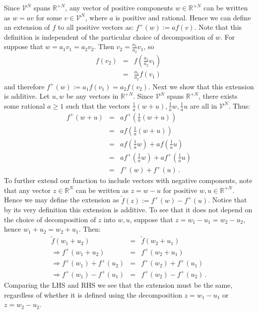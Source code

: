 \documentclass[%
 reprint,superscriptaddress,
 amsmath,amssymb,
 aps,twocolumn,pra
]{revtex4-1}
\newcommand{\eqn}[1]{\begin{eqnarray} #1 \end{eqnarray}}
\begin{document}
\begin{appendix}
Since $\mathcal{V}^N$ spans $\mathbb{R}^{+ N}$, any vector of positive components $w \in \mathbb{R}^{+ N}$ can be written as $w = a v$ for some $v \in \mathcal{V}^N$, where $a$ is positive and rational. Hence we can define an extension of $f$ to all positive vectors as: $f^+(w) := a f(v)$. Note that this definition is independent of the particular choice of  decomposition of $w$. For suppose that $w = a_1 v_1 = a_2 v_2$. Then $v_2 = \frac{a_1}{a_2} v_1$, so
\eqn{
f(v_2) &=& f\left( \frac{a_1}{a_2} v_1 \right) \nonumber \\
&=& \frac{a_1}{a_2} f\left( v_1 \right) \,
}
and therefore $f^{+}(w) := a_1 f(v_1) = a_2 f(v_2)$. Next we show that this extension is additive. Let $u,w$ be any vectors in $\mathbb{R}^{+ N}$. Since $\mathcal{V}^N$ spans $\mathbb{R}^{+ N}$, there exists some rational $a \geq 1$ such that the vectors $\frac{1}{a}(w+u),\frac{1}{a}w, \frac{1}{a}u$ are all in $\mathcal{V}^N$. Thus:
\eqn{
f^{+}(w+u) &=& a f^{+}\left( \frac{1}{a}(w+u) \right) \nonumber \\
&=& a f\left( \frac{1}{a}(w+u) \right) \nonumber \\
&=& a f\left( \frac{1}{a}w \right) + a f\left( \frac{1}{a}u \right) \nonumber \\
&=& a f^{+}\left( \frac{1}{a}w \right) + a f^{+}\left( \frac{1}{a}u \right) \nonumber \\
&=& f^{+}\left( w \right) +  f^{+}\left( u \right) \, .
}
To further extend our function to include vectors with negative components, note that any vector $z \in \mathbb{R}^{N}$ can be written as $z = w-u$ for positive $w,u \in \mathbb{R}^{+ N}$. Hence we may define the extension as $ \tilde{f}(z) := f^{+}(w)-f^{+}(u)$. Notice that by its very definition this extension is additive. To see that it does not depend on the choice of decomposition of $z$ into $w,u$, suppose that $z = w_1 - u_1 = w_2 - u_2$, hence $w_1+u_2 = w_2+u_1$. Then:
\eqn{
\tilde{f}(w_1+u_2) &=& \tilde{f}(w_2+u_1) \nonumber \\
\Rightarrow f^{+}(w_1+u_2) &=& f^{+}(w_2+u_1) \nonumber \\
\Rightarrow f^{+}(w_1)+f^{+}(u_2) &=& f^{+}(w_2)+f^{+}(u_1) \nonumber \\
\Rightarrow f^{+}(w_1)-f^{+}(u_1) &=& f^{+}(w_2)-f^{+}(u_2) \, .
}
Comparing the LHS and RHS we see that the extension must be the same, regardless of whether it is defined using the decomposition $z = w_1 - u_1$ or $z = w_2 - u_2$.


\end{appendix}
\end{document}
